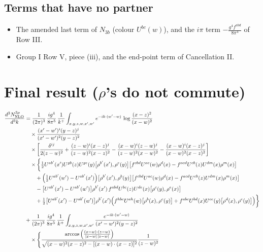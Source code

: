 \documentclass[9pt]{article}
\numberwithin{equation}{section}
\begin{document}
\subsection{Terms that have no partner}
\begin{itemize}
\item The amended last term of $N_{3b}$ (colour $U^{bc}(w)$), and the $i\pi$ term $-\frac{g^{4}f^{abd}}{8\pi^{4}}$ of Row III.
\item Group I Row V, piece (iii), and the end-point term of Cancellation II.
\end{itemize}

\section{Final result ($\rho$'s do not commute)}
\begin{align}
\frac{d^{3}N^{3\rho}_{\rm NLO}}{d^{3}k}&=\frac{1}{(2\pi)^{3}}\,\frac{ig^{4}}{8\pi^{5}}\,\frac{1}{k^{+}}\int_{x,y,z,w,x',w'}e^{-ik\cdot(w'-w)}\,\log\frac{(x-z)^{2}}{(x-w)^{2}}\notag\\&\quad\times\frac{(x'-w')^{i}(y-z)^{j}}{(x'-w')^{2}(y-z)^{2}}\notag\\
&\quad\times\bigg[\frac{\delta^{ij}}{2(z-w)^{2}}+\frac{(z-w)^{i}(x-z)^{j}}{(z-w)^{2}(x-z)^{2}}-\frac{(x-w)^{i}(z-w)^{j}}{(z-w)^{2}(x-w)^{2}}-\frac{(x-w)^{i}(x-z)^{j}}{(x-w)^{2}(x-z)^{2}}\bigg]\notag\\
&\quad\times\bigg\{\tfrac12U^{ab'}(x')U^{gb}(z)U^{ge}(y)\big[\rho^{b'}(x'),\rho^{e}(y)\big]\big[f^{cbd}U^{ac}(w)\rho^{d}(x)-f^{acd}U^{cb}(z)U^{dm}(x)\rho^{m}(x)\big]\notag\\
&\qquad+\Big(\tfrac12U^{ab'}(w')-U^{ab'}(x')\Big)\big[\rho^{b'}(x'),\rho^{b}(y)\big]\big[f^{cbd}U^{ac}(w)\rho^{d}(x)-f^{acd}U^{cb}(z)U^{dm}(x)\rho^{m}(x)\big]\notag\\
&\qquad-\big[U^{ab'}(x')-U^{ab'}(w')\big]\rho^{b'}(x')\,f^{abd}U^{bc}(z)U^{de}(x)\big[\rho^{c}(y),\rho^{e}(x)\big]\notag\\
&\qquad+\tfrac12\big[U^{ab'}(x')-U^{ab'}(w')\big]\rho^{b'}(x')\Big(f^{hbc}U^{ah}(w)\big[\rho^{b}(x),\rho^{c}(y)\big]+f^{abc}U^{bd}(x)U^{ce}(y)\big[\rho^{d}(x),\rho^{e}(y)\big]\Big)\bigg\}\notag\\[6pt]
&+\frac{1}{(2\pi)^{3}}\,\frac{ig^{4}}{8\pi^{5}}\,\frac{1}{k^{+}}\int_{x,y,z,w,x',w'}\frac{e^{-ik\cdot(w'-w)}}{(x'-w')^{2}(y-z)^{2}}\notag\\
&\quad\times\Bigg\{\frac{\arccos\Big(\frac{(x-w)\cdot(z-w)}{|x-w|\,|z-w|}\Big)}{\sqrt{(x-w)^{2}(x-z)^{2}-[(x-w)\cdot(x-z)]^{2}}}\frac{1}{(z-w)^{2}}\notag\\

\end{align}
\end{document}
